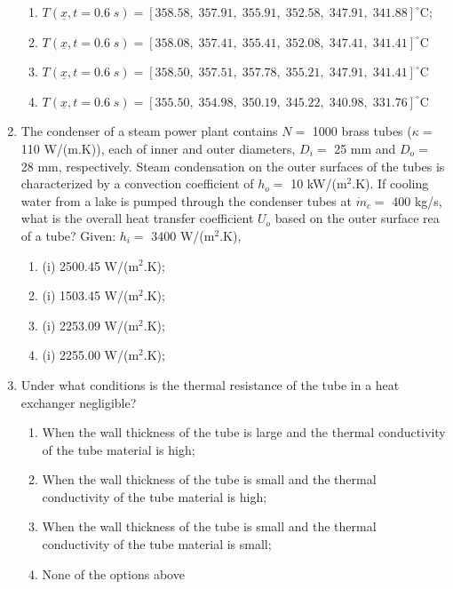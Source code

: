 \documentclass[12pts,a4paper,amsmath,amssymb,floatfix]{article}%
\begin{document}
\begin{enumerate}
\begin{enumerate}
   \item $T\left(\underline{x},t=0.6\;s\right)= \left[ 358.58,\; 357.91,\; 355.91,\; 352.58,\; 347.91,\; 341.88\right]^{\circ}$C; %
   \item $T\left(\underline{x},t=0.6\;s\right)= \left[ 358.08,\; 357.41,\; 355.41,\; 352.08,\; 347.41,\; 341.41\right]^{\circ}$C
   \item $T\left(\underline{x},t=0.6\;s\right)= \left[ 358.50,\; 357.51,\; 357.78,\; 355.21,\; 347.91,\; 341.41\right]^{\circ}$C
   \item $T\left(\underline{x},t=0.6\;s\right)= \left[ 355.50,\; 354.98,\; 350.19,\; 345.22,\; 340.98,\; 331.76\right]^{\circ}$C
\end{enumerate}
%
\item The condenser of a steam power plant contains $N=$ 1000 brass tubes ($\kappa=$ 110 W/(m.K)), each of inner and outer diameters, $D_{i}=$ 25 mm and $D_{o}=$ 28 mm, respectively. Steam condensation on the outer surfaces of the tubes is characterized by a convection coefficient of $h_{o}=$ 10 kW/(m$^{2}$.K). If cooling water from a lake is pumped through the condenser tubes at $\dot{m}_{c}=$ 400 kg/s, what is the overall heat transfer coefficient $U_{o}$ based on the outer surface rea of a tube?  Given: $h_{i}=$ 3400 W/(m$^{2}$.K), %
\begin{enumerate}
 \item (i) 2500.45 W/(m$^{2}$.K);
 \item (i) 1503.45 W/(m$^{2}$.K);
 \item (i) 2253.09 W/(m$^{2}$.K); %
 \item (i) 2255.00 W/(m$^{2}$.K);
\end{enumerate}
%
\item Under what conditions is the thermal resistance of the tube in a heat exchanger negligible? %
\begin{enumerate}
 \item When the wall thickness of the tube is large and the thermal conductivity of the tube material is high;
 \item When the wall thickness of the tube is small and the thermal conductivity of the tube material is high; %
 \item When the wall thickness of the tube is small and the thermal conductivity of the tube material is small;
 \item None of the options above
\end{enumerate}

\end{enumerate}
\end{document}
